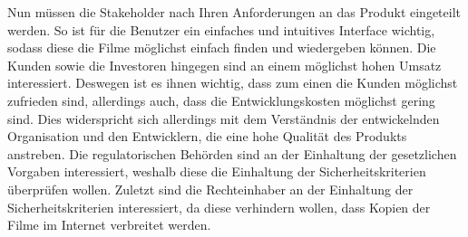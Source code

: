 Nun müssen die Stakeholder nach Ihren Anforderungen an das Produkt eingeteilt werden.
So ist für die Benutzer ein einfaches und intuitives Interface wichtig, sodass diese die Filme möglichst einfach finden und wiedergeben können.
Die Kunden sowie die Investoren hingegen sind an einem möglichst hohen Umsatz interessiert.
Deswegen ist es ihnen wichtig, dass zum einen die Kunden möglichst zufrieden sind, allerdings auch, dass die Entwicklungskosten möglichst gering sind.
Dies widerspricht sich allerdings mit dem Verständnis der entwickelnden Organisation und den Entwicklern, die eine hohe Qualität des Produkts anstreben.
Die regulatorischen Behörden sind an der Einhaltung der gesetzlichen Vorgaben interessiert, weshalb diese die Einhaltung der Sicherheitskriterien überprüfen wollen.
Zuletzt sind die Rechteinhaber an der Einhaltung der Sicherheitskriterien interessiert, da diese verhindern wollen, dass Kopien der Filme im Internet verbreitet werden.
